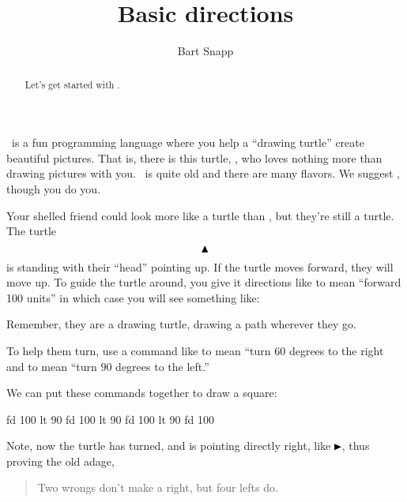 \documentclass[noauthor,nooutcomes,12pt]{ximera}
\title{Basic directions}
\author{Bart Snapp}
\begin{document}
\begin{abstract}
Let's get started with \LOGO.
\end{abstract}
\maketitle

\nameblankgen

\begin{multicols*}{2}
\LOGO~is a fun programming language where you help a ``drawing
turtle'' create beautiful pictures. That is, there is this turtle,
\turtle, who loves nothing more than drawing pictures with
you. \LOGO~is quite old and there are many flavors. We suggest
\logoFlavor, though you do you.

Your shelled friend could look more like a turtle than \turtle, but
they're still a turtle. The turtle
\[
\turtle
\]
is standing with their ``head'' pointing up. If the turtle moves
forward, they will move up.  To guide the turtle around, you give it
directions like  to mean ``forward 100 units'' in which
case you will see something like:
\begin{logoout}
\end{logoout}
Remember, they are a drawing turtle, drawing a path wherever they go.

To help them turn, use a command like  to mean ``turn $60$
degrees to the right and  to mean ``turn $90$ degrees to the
left.''


\columnbreak

We can put these commands together to draw a square:


\begin{logo}
fd 100
lt 90
fd 100
lt 90
fd 100
lt 90
fd 100
\end{logo}
\begin{logoout}
\end{logoout}

Note, now the turtle has turned, and is pointing directly right, like
$\turtler$, thus proving the old adage,
\begin{quote}
  Two wrongs don't make a right, but four lefts do.
\end{quote}


\end{multicols*}
\end{document}
